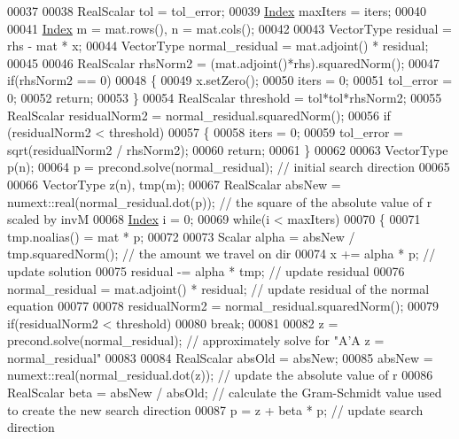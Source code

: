 \begin{DoxyCode}
00037   
00038   RealScalar tol = tol\_error;
00039   \hyperlink{namespace_eigen_a62e77e0933482dafde8fe197d9a2cfde}{Index} maxIters = iters;
00040   
00041   \hyperlink{namespace_eigen_a62e77e0933482dafde8fe197d9a2cfde}{Index} m = mat.rows(), n = mat.cols();
00042 
00043   VectorType residual        = rhs - mat * x;
00044   VectorType normal\_residual = mat.adjoint() * residual;
00045 
00046   RealScalar rhsNorm2 = (mat.adjoint()*rhs).squaredNorm();
00047   \textcolor{keywordflow}{if}(rhsNorm2 == 0) 
00048   \{
00049     x.setZero();
00050     iters = 0;
00051     tol\_error = 0;
00052     \textcolor{keywordflow}{return};
00053   \}
00054   RealScalar threshold = tol*tol*rhsNorm2;
00055   RealScalar residualNorm2 = normal\_residual.squaredNorm();
00056   \textcolor{keywordflow}{if} (residualNorm2 < threshold)
00057   \{
00058     iters = 0;
00059     tol\_error = sqrt(residualNorm2 / rhsNorm2);
00060     \textcolor{keywordflow}{return};
00061   \}
00062   
00063   VectorType p(n);
00064   p = precond.solve(normal\_residual);                         \textcolor{comment}{// initial search direction}
00065 
00066   VectorType z(n), tmp(m);
00067   RealScalar absNew = numext::real(normal\_residual.dot(p));  \textcolor{comment}{// the square of the absolute value of r
       scaled by invM}
00068   \hyperlink{namespace_eigen_a62e77e0933482dafde8fe197d9a2cfde}{Index} i = 0;
00069   \textcolor{keywordflow}{while}(i < maxIters)
00070   \{
00071     tmp.noalias() = mat * p;
00072 
00073     Scalar alpha = absNew / tmp.squaredNorm();      \textcolor{comment}{// the amount we travel on dir}
00074     x += alpha * p;                                 \textcolor{comment}{// update solution}
00075     residual -= alpha * tmp;                        \textcolor{comment}{// update residual}
00076     normal\_residual = mat.adjoint() * residual;     \textcolor{comment}{// update residual of the normal equation}
00077     
00078     residualNorm2 = normal\_residual.squaredNorm();
00079     \textcolor{keywordflow}{if}(residualNorm2 < threshold)
00080       \textcolor{keywordflow}{break};
00081     
00082     z = precond.solve(normal\_residual);             \textcolor{comment}{// approximately solve for "A'A z = normal\_residual"}
00083 
00084     RealScalar absOld = absNew;
00085     absNew = numext::real(normal\_residual.dot(z));  \textcolor{comment}{// update the absolute value of r}
00086     RealScalar beta = absNew / absOld;              \textcolor{comment}{// calculate the Gram-Schmidt value used to create the
       new search direction}
00087     p = z + beta * p;                               \textcolor{comment}{// update search direction}

\end{DoxyCode}
